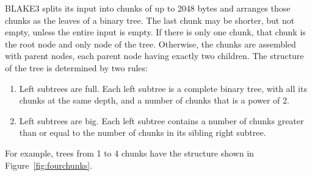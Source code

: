\documentclass[11pt,notitlepage,a4paper]{article}
\begin{document}
BLAKE3 splits its input into chunks of up to 2048 bytes and arranges those
chunks as the leaves of a binary tree. The last chunk may be shorter, but not
empty, unless the entire input is empty. If there is only one chunk, that chunk
is the root node and only node of the tree. Otherwise, the chunks are assembled
with parent nodes, each parent node having exactly two children. The
structure of the tree is determined by two rules:
\begin{enumerate}
    \item Left subtrees are full. Each left subtree is a complete binary tree,
        with all its chunks at the same depth, and a number of chunks that is a
        power of 2.
    \item Left subtrees are big. Each left subtree contains a number of chunks
        greater than or equal to the number of chunks in its sibling right
        subtree.
\end{enumerate}
For example, trees from 1 to 4 chunks have the structure shown in
Figure~\ref{fig:fourchunks}.
\end{document}
